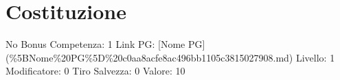 \section{Costituzione}\label{costituzione}

\begin{description}
\tightlist
\item[Tags: STAT]
No Bonus Competenza: 1 Link PG: {[}Nome PG{]}
(\%5BNome\%20PG\%5D\%20c0aa8acfe8ac496bb1105c3815027908.md) Livello: 1
Modificatore: 0 Tiro Salvezza: 0 Valore: 10
\end{description}
